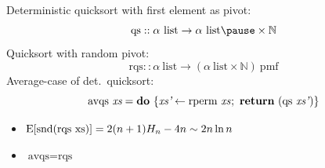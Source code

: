 \documentclass[%
	sans,
	12pt,
]{beamer}
\makeatletter
\newcommand{\listapp}{\mathbin{@}}
\newcommand{\expectation}{\text{\upshape E}}
\makeatother
\begin{document}
\begin{frame}
Deterministic quicksort with first element as pivot:
\[\text{qs} :: \alpha\ \text{list} \to \alpha\ \text{list}\pause \times \mathbb{N}\]\pause
Quicksort with random pivot:
\[\text{rqs} :: \alpha\ \text{list} \to (\alpha\ \text{list} \times \mathbb{N})\ \text{pmf}\]\pause
Average-case of det.\ quicksort:
\[\text{avqs}\ \textit{xs} = \textbf{do}\ \{\textit{xs'} \leftarrow \text{rperm}\ \textit{xs}\hskip0.2mm;\ \textbf{return}\ (\text{qs}\ \textit{xs'}\hskip0.2mm)\}\]\pause
\vspace*{-1.5em}
\begin{theorem}
\upshape
\begin{itemize}
\item $\expectation[\text{snd}(\text{rqs}\ \text{xs})] = 2(n+1) H_n - 4n \sim 2 n \ln n$\pause
\item $\text{avqs} = \text{rqs}$
\end{itemize}
\end{theorem}
\end{frame}

\end{document}
